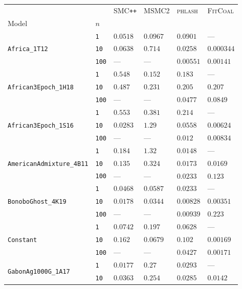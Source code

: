 \begin{footnotesize}
\begin{tabular}{llllll}
\toprule
 &  & \textsc{SMC}\texttt{{++}} & \textsc{MSMC2} & \textsc{phlash} & \textsc{FitCoal} \\
Model & $n$ &  &  &  &  \\
\midrule
\multirow[c]{3}{*}{\texttt{Africa\_1T12}} & \texttt{1} & $0.0518$ & $0.0967$ & $0.0901$ & --- \\
 & \texttt{10} & $0.0638$ & $0.714$ & $0.0258$ & $0.000344$ \\
 & \texttt{100} & --- & --- & $0.00551$ & $0.00141$ \\
\cline{1-6}
\multirow[c]{3}{*}{\texttt{African3Epoch\_1H18}} & \texttt{1} & $0.548$ & $0.152$ & $0.183$ & --- \\
 & \texttt{10} & $0.487$ & $0.231$ & $0.205$ & $0.207$ \\
 & \texttt{100} & --- & --- & $0.0477$ & $0.0849$ \\
\cline{1-6}
\multirow[c]{3}{*}{\texttt{African3Epoch\_1S16}} & \texttt{1} & $0.553$ & $0.381$ & $0.214$ & --- \\
 & \texttt{10} & $0.0283$ & $1.29$ & $0.0558$ & $0.00624$ \\
 & \texttt{100} & --- & --- & $0.012$ & $0.00834$ \\
\cline{1-6}
\multirow[c]{3}{*}{\texttt{AmericanAdmixture\_4B11}} & \texttt{1} & $0.184$ & $1.32$ & $0.0148$ & --- \\
 & \texttt{10} & $0.135$ & $0.324$ & $0.0173$ & $0.0169$ \\
 & \texttt{100} & --- & --- & $0.0233$ & $0.123$ \\
\cline{1-6}
\multirow[c]{3}{*}{\texttt{BonoboGhost\_4K19}} & \texttt{1} & $0.0468$ & $0.0587$ & $0.0233$ & --- \\
 & \texttt{10} & $0.0178$ & $0.0344$ & $0.00828$ & $0.00351$ \\
 & \texttt{100} & --- & --- & $0.00939$ & $0.223$ \\
\cline{1-6}
\multirow[c]{3}{*}{\texttt{Constant}} & \texttt{1} & $0.0742$ & $0.197$ & $0.0628$ & --- \\
 & \texttt{10} & $0.162$ & $0.0679$ & $0.102$ & $0.00169$ \\
 & \texttt{100} & --- & --- & $0.0427$ & $0.00171$ \\
\cline{1-6}
\multirow[c]{3}{*}{\texttt{GabonAg1000G\_1A17}} & \texttt{1} & $0.0177$ & $0.27$ & $0.0293$ & --- \\
 & \texttt{10} & $0.0363$ & $0.254$ & $0.0285$ & $0.0142$ \\

\end{tabular}
\end{footnotesize}
